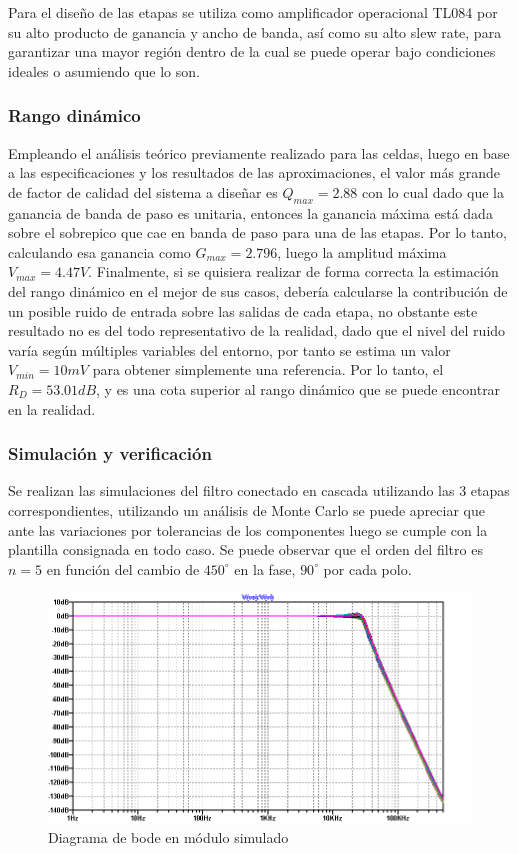 Para el dise\~no de las etapas se utiliza como amplificador operacional TL084 por su alto producto de ganancia y ancho de banda, as\'i como su alto slew rate, para garantizar una mayor regi\'on dentro de la cual se puede operar bajo condiciones ideales o asumiendo que lo son.

\subsubsection{Rango din\'amico}
Empleando el an\'alisis te\'orico previamente realizado para las celdas, luego en base a las especificaciones y los resultados de las aproximaciones, el valor m\'as grande de factor de calidad del sistema a dise\~nar
es $Q_{max} = 2.88$ con lo cual dado que la ganancia de banda de paso es unitaria, entonces la ganancia m\'axima est\'a dada sobre el sobrepico que cae en banda de paso para una de las etapas. Por lo tanto,
calculando esa ganancia como $G_{max} = 2.796$, luego la amplitud m\'axima $V_{max} = 4.47V$. Finalmente, si se quisiera realizar de forma correcta la estimaci\'on del rango din\'amico en el mejor de sus casos,
deber\'ia calcularse la contribuci\'on de un posible ruido de entrada sobre las salidas de cada etapa, no obstante este resultado no es del todo representativo de la realidad, dado que el nivel del ruido var\'ia
seg\'un m\'ultiples variables del entorno, por tanto se estima un valor $V_{min} = 10mV$ para obtener simplemente una referencia. Por lo tanto, el $R_D = 53.01dB$, y es una cota superior al rango din\'amico que se
puede encontrar en la realidad.

\subsubsection{Simulaci\'on y verificaci\'on}
Se realizan las simulaciones del filtro conectado en cascada utilizando las 3 etapas correspondientes, utilizando un an\'alisis de Monte Carlo se puede apreciar que ante las variaciones por tolerancias
de los componentes luego se cumple con la plantilla consignada en todo caso. Se puede observar que el orden del filtro es $n = 5$ en funci\'on del cambio de $450^{\circ}$ en la fase, $90^{\circ}$ por cada polo.

\begin{figure}[H]
	\centering
	\includegraphics[scale=0.6]{../EJ1/Recursos/legendre_verificacion_magnitud.png}
	\caption{Diagrama de bode en m\'odulo simulado}
\end{figure}

